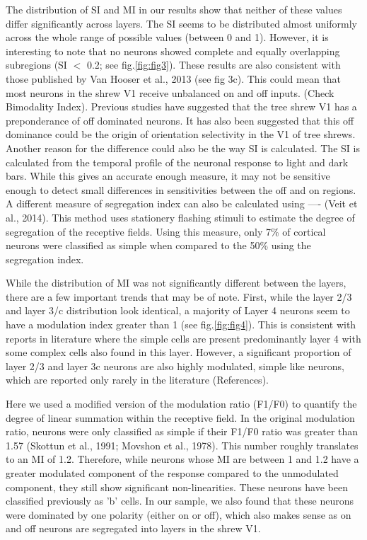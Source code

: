 	The distribution of SI and MI in our results show that neither of these values differ significantly across layers. The SI seems to be distributed almost uniformly across the whole range of possible values (between 0 and 1). However, it is interesting to note that no neurons showed complete and equally overlapping subregions (SI $<$ 0.2; see fig.\ref{fig:fig3}). These results are also consistent with those published by Van Hooser et al., 2013 (see fig 3c). This could mean that most neurons in the shrew V1 receive unbalanced on and off inputs. (Check Bimodality Index). Previous studies have suggested that the tree shrew V1 has a preponderance of off dominated neurons. It has also been suggested that this off dominance could be the origin of orientation selectivity in the V1 of tree shrews. Another reason for the difference could also be the way SI is calculated. The SI is calculated from the temporal profile of the neuronal response to light and dark bars. While this gives an accurate enough measure, it may not be sensitive enough to detect small differences in sensitivities between the off and on regions. A different measure of segregation index can also be calculated using ---- (Veit et al., 2014). This method uses stationery flashing stimuli to estimate the degree of segregation of the receptive fields. Using this measure, only 7\% of cortical neurons were classified as simple when compared to the 50\% using the segregation index.
	
	While the distribution of MI was not significantly different between the layers, there are a few important trends that may be of note. First, while the layer 2/3 and layer 3/c distribution look identical, a majority of Layer 4 neurons seem to have a modulation index greater than 1 (see fig.\ref{fig:fig4}). This is consistent with reports in literature where the simple cells are present predominantly layer 4 with some complex cells also found in this layer. However, a significant proportion of layer 2/3 and layer 3c neurons are also highly modulated, simple like neurons, which are reported only rarely in the literature (References). 
	
	Here we used a modified version of the modulation ratio (F1/F0) to quantify the degree of linear summation within the receptive field. In the original modulation ratio, neurons were only classified as simple if their F1/F0 ratio was greater than 1.57 (Skottun et al., 1991; Movshon et al., 1978). This number roughly translates to an MI of 1.2. Therefore, while neurons whose MI are between 1 and 1.2 have a greater modulated component of the response compared to the unmodulated component, they still show significant non-linearities. These neurons have been classified previously as 'b' cells. In our sample, we also found that these neurons were dominated by one polarity (either on or off), which also makes sense as on and off neurons are segregated into layers in the shrew V1.

